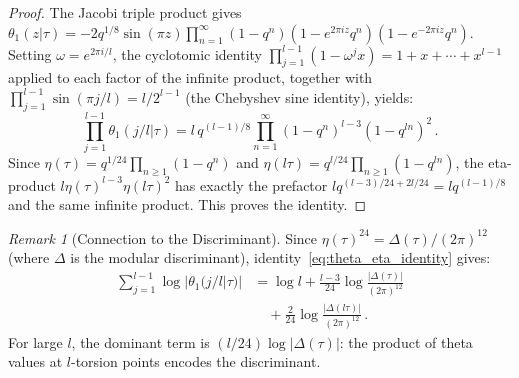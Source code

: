 \documentclass[aps,prd,twocolumn,superscriptaddress,nofootinbib,floatfix]{revtex4-2}
\theoremstyle{definition}
\theoremstyle{remark}
\newtheorem{remark}[theorem]{Remark}
\begin{document}
\begin{proof}
The Jacobi triple product gives $\theta_1(z|\tau) = -2q^{1/8}\sin(\pi z)\prod_{n=1}^{\infty}(1-q^n)(1-e^{2\pi i z}q^n)(1-e^{-2\pi i z}q^n)$.
Setting $\omega = e^{2\pi i/l}$, the cyclotomic identity $\prod_{j=1}^{l-1}(1-\omega^j x) = 1 + x + \cdots + x^{l-1}$ applied to each factor of the infinite product, together with $\prod_{j=1}^{l-1}\sin(\pi j/l) = l/2^{l-1}$ (the Chebyshev sine identity), yields:
\[
\prod_{j=1}^{l-1}\theta_1(j/l|\tau)
= l\,q^{(l-1)/8}
\prod_{n=1}^{\infty}(1-q^n)^{l-3}(1-q^{ln})^2\,.
\]
Since $\eta(\tau) = q^{1/24}\prod_{n\geq1}(1-q^n)$ and $\eta(l\tau) = q^{l/24}\prod_{n\geq1}(1-q^{ln})$, the eta-product $l\eta(\tau)^{l-3}\eta(l\tau)^2$ has exactly the prefactor $lq^{(l-3)/24+2l/24}=lq^{(l-1)/8}$ and the same infinite product. This proves the identity.
\end{proof}

\begin{remark}[Connection to the Discriminant]
\label{rem:theta_discriminant}
Since $\eta(\tau)^{24} = \Delta(\tau)/(2\pi)^{12}$ (where $\Delta$ is the modular discriminant), identity~\eqref{eq:theta_eta_identity} gives:
\begin{equation}
\begin{aligned}
\sum_{j=1}^{l-1} \log|\theta_1(j/l|\tau)|
&= \log l
 + \frac{l-3}{24}\log\frac{|\Delta(\tau)|}{(2\pi)^{12}} \\
&\quad + \frac{2}{24}\log\frac{|\Delta(l\tau)|}{(2\pi)^{12}}\,.
\end{aligned}
\label{eq:theta_log_discriminant}
\end{equation}
For large $l$, the dominant term is $(l/24)\log|\Delta(\tau)|$: the product of theta values at $l$-torsion points encodes the discriminant.
\end{remark}
\end{document}
